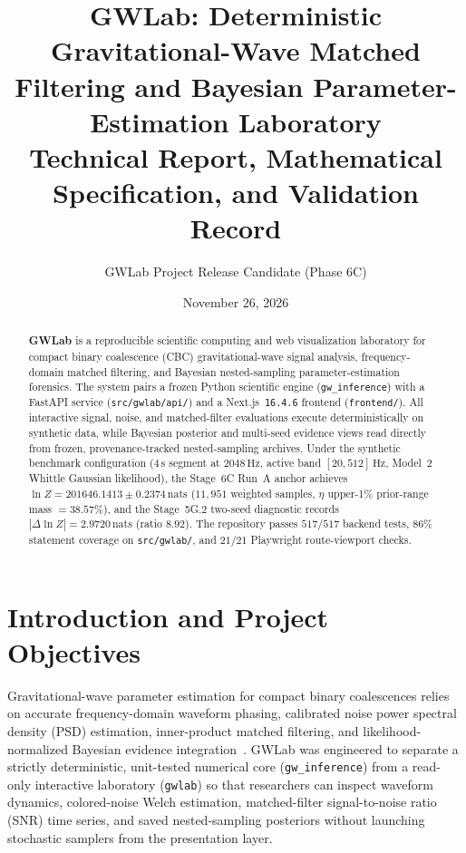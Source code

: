 \documentclass[11pt,a4paper]{article}
\title{\textbf{GWLab: Deterministic Gravitational-Wave Matched Filtering and Bayesian Parameter-Estimation Laboratory}\\[0.4em]
\large Technical Report, Mathematical Specification, and Validation Record}
\author{GWLab Project Release Candidate (Phase 6C)}
\date{November 26, 2026}
\begin{document}
\maketitle

\begin{abstract}
\textbf{GWLab} is a reproducible scientific computing and web visualization laboratory for compact binary coalescence (CBC) gravitational-wave signal analysis, frequency-domain matched filtering, and Bayesian nested-sampling parameter-estimation forensics. The system pairs a frozen Python scientific engine (\texttt{gw\_inference}) with a FastAPI service (\texttt{src/gwlab/api/}) and a Next.js~\texttt{16.4.6} frontend (\texttt{frontend/}). All interactive signal, noise, and matched-filter evaluations execute deterministically on synthetic data, while Bayesian posterior and multi-seed evidence views read directly from frozen, provenance-tracked nested-sampling archives. Under the synthetic benchmark configuration ($4\,\mathrm{s}$ segment at $2048\,\mathrm{Hz}$, active band $[20, 512]\,\mathrm{Hz}$, Model~2 Whittle Gaussian likelihood), the Stage~6C Run~A anchor achieves $\ln Z = 201646.1413 \pm 0.2374\,\mathrm{nats}$ ($11{,}951$ weighted samples, $\eta$ upper-1\% prior-range mass $= 38.57\%$), and the Stage~5G.2 two-seed diagnostic records $|\Delta \ln Z| = 2.9720\,\mathrm{nats}$ (ratio $8.92$). The repository passes $517/517$ backend tests, $86\%$ statement coverage on \texttt{src/gwlab/}, and $21/21$ Playwright route-viewport checks.
\end{abstract}

\tableofcontents
\newpage

\section{Introduction and Project Objectives}
Gravitational-wave parameter estimation for compact binary coalescences relies on accurate frequency-domain waveform phasing, calibrated noise power spectral density (PSD) estimation, inner-product matched filtering, and likelihood-normalized Bayesian evidence integration~\cite{Finn1992,CutlerFlanagan1994}. GWLab was engineered to separate a strictly deterministic, unit-tested numerical core (\texttt{gw\_inference}) from a read-only interactive laboratory (\texttt{gwlab}) so that researchers can inspect waveform dynamics, colored-noise Welch estimation, matched-filter signal-to-noise ratio (SNR) time series, and saved nested-sampling posteriors without launching stochastic samplers from the presentation layer.
\end{document}
